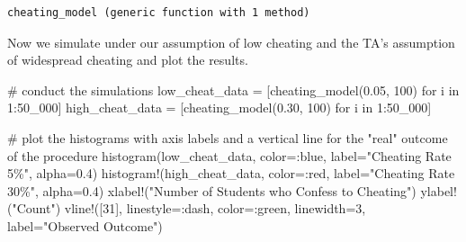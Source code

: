 \documentclass[
  letterpaper,
  DIV=11,
  numbers=noendperiod]{scrartcl}
\newenvironment{Shaded}{\begin{snugshade}}{\end{snugshade}}
\newcommand{\CommentTok}[1]{\textcolor[rgb]{0.37,0.37,0.37}{#1}}
\newcommand{\FloatTok}[1]{\textcolor[rgb]{0.68,0.00,0.00}{#1}}
\newcommand{\FunctionTok}[1]{\textcolor[rgb]{0.28,0.35,0.67}{#1}}
\newcommand{\KeywordTok}[1]{\textcolor[rgb]{0.00,0.23,0.31}{#1}}
\newcommand{\NormalTok}[1]{\textcolor[rgb]{0.00,0.23,0.31}{#1}}
\newcommand{\OperatorTok}[1]{\textcolor[rgb]{0.37,0.37,0.37}{#1}}
\newcommand{\StringTok}[1]{\textcolor[rgb]{0.13,0.47,0.30}{#1}}
\begin{document}
\begin{verbatim}
cheating_model (generic function with 1 method)
\end{verbatim}

Now we simulate under our assumption of low cheating and the TA's
assumption of widespread cheating and plot the results.

\begin{Shaded}
\begin{Highlighting}[]
\CommentTok{\# conduct the simulations}
\NormalTok{low\_cheat\_data }\OperatorTok{=}\NormalTok{ [}\FunctionTok{cheating\_model}\NormalTok{(}\FloatTok{0.05}\NormalTok{, }\FloatTok{100}\NormalTok{) for i }\KeywordTok{in} \FloatTok{1}\OperatorTok{:}\FloatTok{50\_000}\NormalTok{]}
\NormalTok{high\_cheat\_data }\OperatorTok{=}\NormalTok{ [}\FunctionTok{cheating\_model}\NormalTok{(}\FloatTok{0.30}\NormalTok{, }\FloatTok{100}\NormalTok{) for i }\KeywordTok{in} \FloatTok{1}\OperatorTok{:}\FloatTok{50\_000}\NormalTok{]}

\CommentTok{\# plot the histograms with axis labels and a vertical line for the "real" outcome of the procedure}
\FunctionTok{histogram}\NormalTok{(low\_cheat\_data, color}\OperatorTok{=:}\NormalTok{blue, label}\OperatorTok{=}\StringTok{"Cheating Rate 5\%"}\NormalTok{, alpha}\OperatorTok{=}\FloatTok{0.4}\NormalTok{)}
\FunctionTok{histogram!}\NormalTok{(high\_cheat\_data, color}\OperatorTok{=:}\NormalTok{red, label}\OperatorTok{=}\StringTok{"Cheating Rate 30\%"}\NormalTok{, alpha}\OperatorTok{=}\FloatTok{0.4}\NormalTok{)}
\FunctionTok{xlabel!}\NormalTok{(}\StringTok{"Number of Students who Confess to Cheating"}\NormalTok{)}
\FunctionTok{ylabel!}\NormalTok{(}\StringTok{"Count"}\NormalTok{)}
\FunctionTok{vline!}\NormalTok{([}\FloatTok{31}\NormalTok{], linestyle}\OperatorTok{=:}\NormalTok{dash, color}\OperatorTok{=:}\NormalTok{green, linewidth}\OperatorTok{=}\FloatTok{3}\NormalTok{, label}\OperatorTok{=}\StringTok{"Observed Outcome"}\NormalTok{)}
\end{Highlighting}
\end{Shaded}
\end{document}

